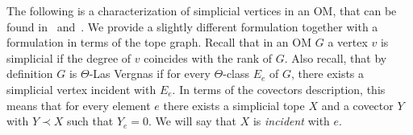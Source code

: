 \documentclass[final,11pt]{article}
\newtheorem{lem}[thm]{Lemma}%
\def\B{\,\square \,}
\begin{document}
% 
% 
% 
% 

The following is a characterization of simplicial vertices in an OM, that can be found in~\cite[Proposition 5, page 320]{Man-82} and~\cite[Proposition 1.4]{lv-80}. We provide a slightly different formulation together with a formulation in terms of the tope graph. Recall that in an OM $G$ a vertex $v$ is simplicial if the degree of $v$ coincides with the rank of $G$. Also recall, that by definition $G$ is $\Theta$-Las Vergnas if for every $\Theta$-class $E_e$ of $G$, there exists a simplicial vertex incident with $E_e$. In terms of the covectors description, this means that for every element $e$ there exists a simplicial tope $X$ and a covector $Y$ with $Y\prec X$ such that $Y_e = 0$. We will say that $X$ is \emph{incident} with $e$.
\end{document}
